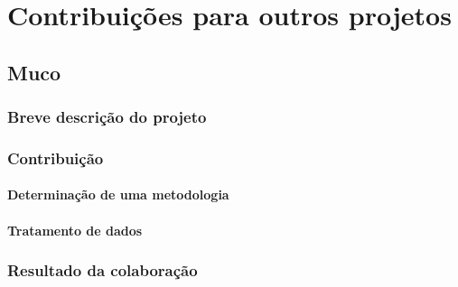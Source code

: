 	
	
\part{Contribuições para outros projetos}
	\chapter{Muco}
		\section{Breve descrição do projeto}
		\section{Contribuição}
			\subsection{Determinação de uma metodologia}
			\subsection{Tratamento de dados}
		\section{Resultado da colaboração}
